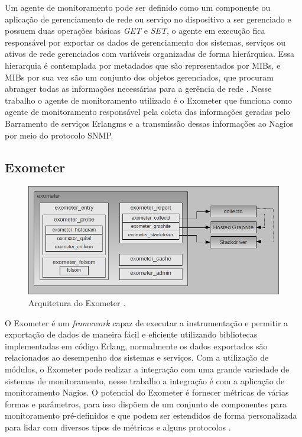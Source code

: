 Um agente de monitoramento pode ser definido como um componente ou aplicação de gerenciamento de rede ou serviço no dispositivo a ser gerenciado e possuem duas operações básicas \textit{GET} e \textit{SET}, o agente em execução fica responsável por exportar os dados de gerenciamento dos sistemas, serviços ou ativos de rede gerenciados com variáveis organizadas de forma hierárquica. Essa hierarquia é contemplada por metadados que são representados por \acrshort{MIBs}, e \acrshort{MIBs} por sua vez são um conjunto dos objetos gerenciados, que procuram abranger todas as informações necessárias para a gerência de rede \cite{6240708}. Nesse trabalho o agente de monitoramento utilizado é o Exometer que funciona como agente de monitoramento responsável pela coleta das informações geradas pelo Barramento de serviços Erlangms e a transmissão dessas informações ao Nagios por meio do protocolo \acrshort{SNMP}. 


\subsection{Exometer}

\begin{figure}[h!]
	\begin{center}
	\includegraphics[scale = 0.60]{img/exometer_overview.png}
		\caption{Arquitetura do Exometer \cite{exometer_core}.}
		\label{fun:fig:zabbix}
	\end{center}
\end{figure}
O Exometer é um \textit{framework} capaz de executar a instrumentação e permitir a exportação de dados de maneira fácil e eficiente utilizando bibliotecas implementadas em código Erlang, normalmente os dados exportados são relacionados ao desempenho dos sistemas e serviços. Com a utilização de módulos, o Exometer pode realizar a integração com uma grande variedade de sistemas de monitoramento, nesse trabalho a integração é com a aplicação de monitoramento Nagios. O potencial do Exometer é fornecer métricas de várias formas e parâmetros, para isso dispõem de um conjunto de componentes para monitoramento pré-definidos e que podem ser estendidos de forma personalizada para lidar com diversos tipos de métricas e alguns protocolos \cite{exometer_core}.




